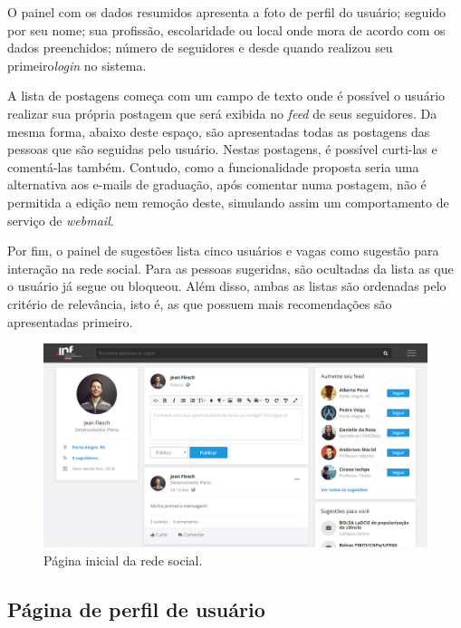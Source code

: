 O painel com os dados resumidos apresenta a foto de perfil do usuário; seguido por seu nome; sua profissão, escolaridade ou local onde mora de acordo com os dados preenchidos; número de seguidores e desde quando realizou seu primeiro\textit{login} no sistema.

A lista de postagens começa com um campo de texto onde é possível o usuário realizar sua própria postagem que será exibida no \textit{feed} de seus seguidores. Da mesma forma, abaixo deste espaço, são apresentadas todas as postagens das pessoas que são seguidas pelo usuário. Nestas postagens, é possível curti-las e comentá-las também. Contudo, como a funcionalidade proposta seria uma alternativa aos e-mails de graduação, após comentar numa postagem, não é permitida a edição nem remoção deste, simulando assim um comportamento de serviço de \textit{webmail}.

Por fim, o painel de sugestões lista cinco usuários e vagas como sugestão para interação na rede social. Para as pessoas sugeridas, são ocultadas da lista as que o usuário já segue ou bloqueou. Além disso, ambas as listas são ordenadas pelo critério de relevância, isto é, as que possuem mais recomendações são apresentadas primeiro.

\begin{figure}[ht]
    \caption{Página inicial da rede social.}
       	\begin{center}
            \includegraphics[width=1\textwidth]{figuras/feed.png}
        \end{center}
    \label{telaHome}
\end{figure}

\subsection{Página de perfil de usuário}
\label{PDVFunProfile}

